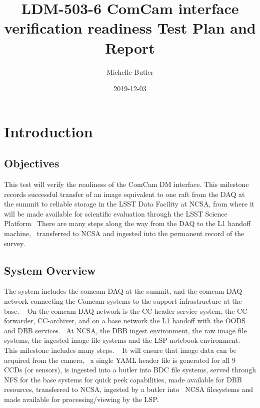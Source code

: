\documentclass[DM,lsstdraft,STR,toc]{lsstdoc}
\begin{document}
\def\milestoneName{ComCam interface verification readiness}
\def\milestoneId{LDM-503-6}
\def\product{Data Management}


\title{ LDM-503-6 ComCam interface verification readiness Test Plan and Report}
\setDocRef{\lsstDocType-\lsstDocNum}
\date{2019-12-03}
\author{ Michelle Butler }






\maketitle

\section{Introduction}
\label{sect:intro}


\subsection{Objectives}
\label{sect:objectives}

This test will verify the readiness of the ComCam DM interface. This
milestone records successful transfer of an image equivalent to one raft
from the DAQ at the summit to reliable storage in the LSST Data Facility
at NCSA, from where it will be made available for scientific evaluation
through the LSST Science Platform ~There are many steps along the way
from the DAQ to the L1 handoff machine, ~transferred to NCSA and
ingested into the permanent record of the survey. ~~



\subsection{System Overview}
\label{sect:systemoverview}

The system includes the comcam DAQ at the summit, and the comcam DAQ
network connecting the Comcam systems to the support infrastructure at
the base. ~ On the comcam DAQ network is the CC-header service system,
the CC-forwarder, CC-archiver, and on a base network the L1 handoff with
the OODS and DBB services. ~At NCSA, the DBB ingest environment, the raw
image file systems, the ingested image file systems and the LSP notebook
environment. ~ This milestone includes many steps. ~ It will ensure that
image data can be acquired from the camera, ~a single YAML header file
is generated for all 9 CCDs (or sensors), is ingested into a butler into
BDC file systems, served through NFS for the base systems for quick peek
capabilities, made available for DBB resources, transferred to NCSA,
ingested by a butler into ~NCSA filesystems and made available for
processing/viewing by the LSP. ~\\[2\baselineskip]
\end{document}
